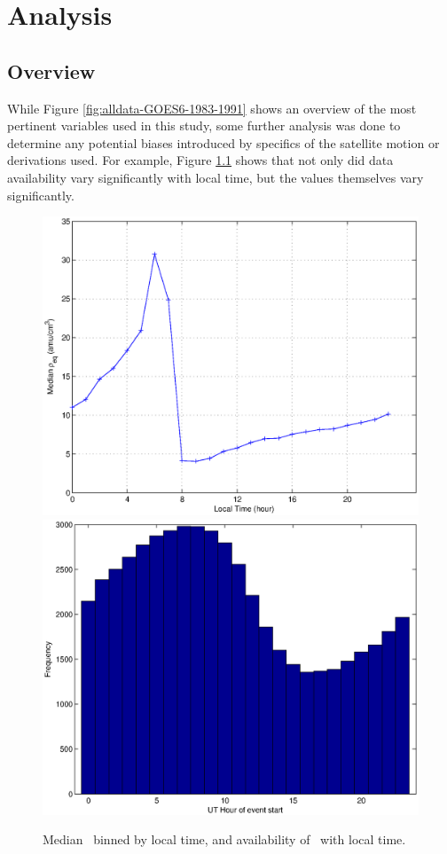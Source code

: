 \chapter[Analysis]{Analysis}

\section{Overview}
While Figure \ref{fig:alldata-GOES6-1983-1991} shows an overview of the most pertinent variables used in this study, some further analysis was done to determine any potential biases introduced by specifics of the satellite motion or derivations used. For example, Figure \ref{fig:ByHourExample} shows that not only did data availability vary significantly with local time, but the values themselves vary significantly. 

\begin{figure}
\centering
\includegraphics[width=0.7\linewidth]{Figures/rhoLT.eps}
\includegraphics[width=0.7\linewidth]{Figures/nansbyhour.eps}
\caption{Median \req\ binned by local time, and availability of \req\ with local time.}
\label{fig:ByHourExample}
\end{figure}

